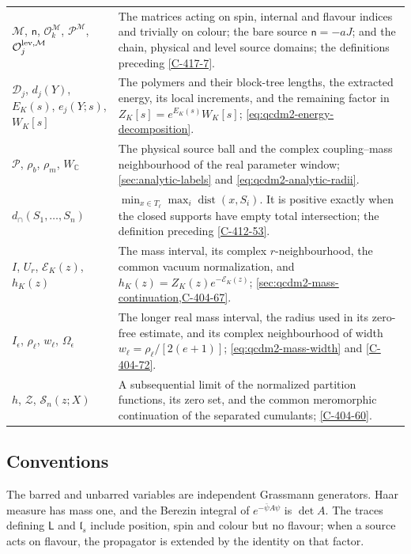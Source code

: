 \documentclass[11pt,letterpaper,reqno]{amsart}
\theoremstyle{definition}
\theoremstyle{remark}
\begin{document}
\begin{longtable}{@{}p{}@{\hspace{0.025\textwidth}}p{}@{}}
$\mathcal M$, $\mathsf n$, $\mathscr O_k^{\mathcal M}$,
$\mathcal P^{\mathcal M}$, $\mathcal O_j^{{\rm lev},\mathcal M}$
& The matrices acting on spin, internal and flavour indices
and trivially on colour; the bare source $\mathsf n=-aJ$;
and the chain, physical and level source domains;
the definitions preceding \cref{C-417-7}.\\
$\mathcal D_j$, $d_j(Y)$, $E_K(s)$, $e_j(Y;s)$, $W_K[s]$
& The polymers and their block-tree lengths, the extracted
energy, its local increments, and the remaining factor in
$Z_K[s]=e^{E_K(s)}W_K[s]$;
\eqref{eq:qcdm2-energy-decomposition}.\\
$\mathcal P$, $\rho_b$, $\rho_m$, $W_{\mathbb C}$
& The physical source ball and the complex coupling--mass
neighbourhood of the real parameter window;
\cref{sec:analytic-labels} and
\eqref{eq:qcdm2-analytic-radii}.\\
$d_\cap(S_1,\ldots,S_n)$
& $\min_{x\in T_\ell}\max_i\operatorname{dist}(x,S_i)$.
It is positive exactly when the closed supports have empty
total intersection; the definition preceding \cref{C-412-53}.\\
$I$, $U_r$, $\mathcal E_K(z)$, $h_K(z)$
& The mass interval, its complex $r$-neighbourhood, the common
vacuum normalization, and $h_K(z)=Z_K(z)e^{-\mathcal E_K(z)}$;
\cref{sec:qcdm2-mass-continuation,C-404-67}.\\
$I_\epsilon$, $\rho_\ell$, $w_\ell$, $\Omega_\epsilon$
& The longer real mass interval, the radius used in its
zero-free estimate, and its complex neighbourhood of width
$w_\ell=\rho_\ell/[2(e+1)]$;
\eqref{eq:qcdm2-mass-width} and \cref{C-404-72}.\\
$h$, $\mathcal Z$, $\mathcal S_n(z;X)$
& A subsequential limit of the normalized partition functions,
its zero set, and the common meromorphic continuation of the
separated cumulants; \cref{C-404-60}.\\
\end{longtable}
\endgroup

\subsection*{Conventions}

The barred and unbarred variables are independent Grassmann
generators. Haar measure has mass one, and the Berezin integral
of $e^{-\bar\psi A\psi}$ is $\det A$. The traces defining
$\mathsf L$ and $\mathfrak l_s$ include position, spin and colour
but no flavour; when a source acts on flavour, the propagator
is extended by the identity on that factor.
\end{document}
